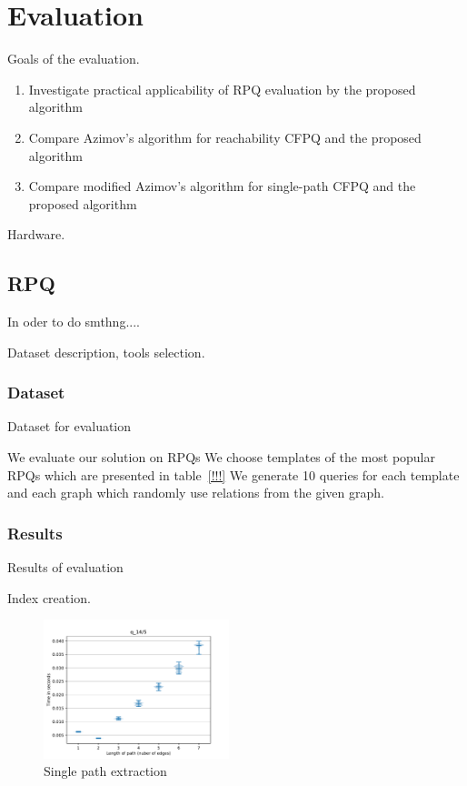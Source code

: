 \section{Evaluation}

Goals of the evaluation.
\begin{enumerate}
	\item Investigate practical applicability of RPQ evaluation by the proposed algorithm
	\item Compare Azimov's algorithm for reachability CFPQ and the proposed algorithm 
	\item Compare modified Azimov's algorithm for single-path CFPQ and the proposed algorithm 
\end{enumerate}

Hardware.

\subsection{RPQ}

In oder to do smthng....

Dataset description, tools selection.

\subsubsection{Dataset}

Dataset for evaluation

We evaluate our solution on RPQs 
We choose templates of the most popular RPQs which are presented in table~\ref{!!!}
We generate 10 queries for each template and each graph which randomly use relations from the given graph.

\subsubsection{Results}

Results of evaluation

Index creation.

\begin{figure}
   \includegraphics[width=0.48\textwidth]{data/res_graphics/q_14_5.pdf}
   \caption{Single path extraction}
\end{figure}

